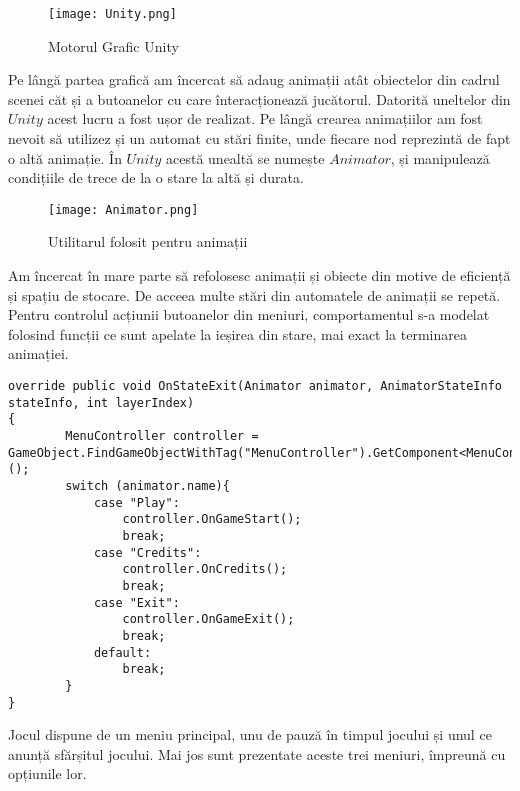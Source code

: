 \vspace{10mm}
\begin{figure}[H]
\centering
\texttt{[image: Unity.png]} \par
\caption{Motorul Grafic Unity}
\end{figure}

Pe lângă partea grafică am încercat să adaug animații  atât obiectelor din cadrul scenei căt și a butoanelor cu care înteracționează jucătorul. Datorită uneltelor din $Unity$ acest lucru a fost ușor de realizat. Pe lângă crearea animațiilor am fost nevoit să utilizez și un automat cu stări finite, unde fiecare nod reprezintă de fapt o altă animație. În $Unity$ acestă unealtă se numește $Animator$, și manipulează condițiile de trece de la o stare la altă și durata.\par

\vspace{10mm}
\begin{figure}[H]
\centering
\texttt{[image: Animator.png]} \par
\caption{Utilitarul folosit pentru animații}
\end{figure}

Am încercat în mare parte să refolosesc animații și obiecte din motive de eficiență și spațiu de stocare. De acceea multe stări din automatele de animații se repetă. Pentru controlul acțiunii butoanelor din meniuri, comportamentul s-a modelat folosind funcții ce sunt apelate la ieșirea din stare, mai exact la terminarea animației.\par

\begin{lstlisting}[caption=Exemplu de folosire a evenimentului $OnStateExit$]
override public void OnStateExit(Animator animator, AnimatorStateInfo stateInfo, int layerIndex)
{
        MenuController controller = GameObject.FindGameObjectWithTag("MenuController").GetComponent<MenuController>();
        switch (animator.name){
            case "Play":
                controller.OnGameStart();
                break;
            case "Credits":
                controller.OnCredits();
                break;
            case "Exit":
                controller.OnGameExit();
                break;
            default:
                break;
        }
}
\end{lstlisting}

Jocul dispune de un meniu principal, unu de pauză în timpul jocului și unul ce anunță sfărșitul jocului. Mai jos sunt prezentate aceste trei meniuri, împreună cu opțiunile lor.\par

